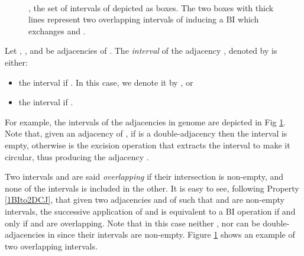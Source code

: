 \documentclass{llncs}
\def\BI{\ensuremath{\mbox{BI}}}
\begin{document}
\begin{figure}[!h]
\centering
{}
\\

\caption{ , the set of intervals of  depicted as boxes. The two boxes with thick lines represent two 
  overlapping intervals of  inducing a \BI\xspace which 
  exchanges  and .}
    \label{fig:intervaldef}
\end{figure}

\begin{definition}
Let ,  , and   be adjacencies of . The \emph{interval} of the adjacency  , denoted by  is either:
\begin{itemize}
\item the interval  if .  In this case, we denote it by , or
\item the interval  if .
\end{itemize}
\end{definition}

For example, the intervals of the adjacencies in genome  are depicted in Fig \ref{fig:intervaldef}.
Note that, given an adjacency   of ,  if   is a double-adjacency then the interval  is empty, otherwise   is the excision operation that extracts the interval  to make it circular, thus producing the adjacency .



Two intervals   and  are said \emph{overlapping} if
their intersection is non-empty, and none of the intervals is included in the 
other.
It is easy to see, following Property \ref{1BIto2DCJ}, that given two
adjacencies  and  of  such that
 and  are non-empty intervals, the
successive application of  and  is
equivalent  to a BI operation if and only if  and
 are overlapping. Note that in this case neither
, nor   can be double-adjacencies in  since
their  intervals are non-empty. Figure \ref{fig:intervaldef} shows an
example of two overlapping intervals. 
\end{document}
